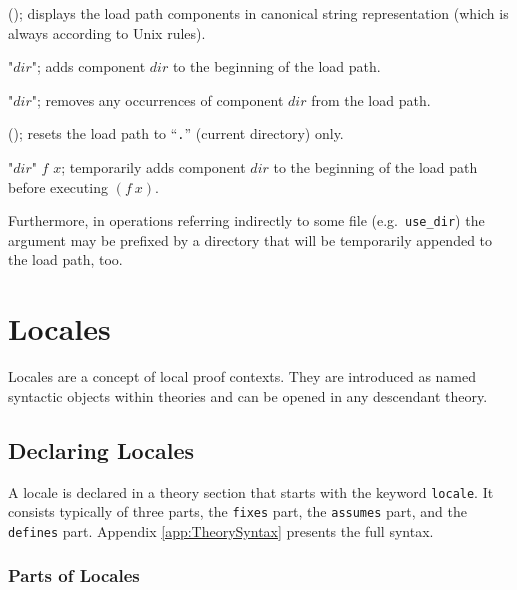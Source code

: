 \begin{ttdescription}
\item[\ttindexbold{show_path}();] displays the load path components in
  canonical string representation (which is always according to Unix rules).
  
\item[\ttindexbold{add_path} "$dir$";] adds component $dir$ to the beginning
  of the load path.
  
\item[\ttindexbold{del_path} "$dir$";] removes any occurrences of component
  $dir$ from the load path.
  
\item[\ttindexbold{reset_path}();] resets the load path to ``\texttt{.}''
  (current directory) only.
  
\item[\ttindexbold{with_path} "$dir$" $f$ $x$;] temporarily adds component
  $dir$ to the beginning of the load path before executing $(f~x)$.

\end{ttdescription}

Furthermore, in operations referring indirectly to some file (e.g.\ 
\texttt{use_dir}) the argument may be prefixed by a directory that will be
temporarily appended to the load path, too.


\section{Locales}
\label{Locales}

Locales \cite{kammueller-locales} are a concept of local proof contexts.  They
are introduced as named syntactic objects within theories and can be
opened in any descendant theory.

\subsection{Declaring Locales}

A locale is declared in a theory section that starts with the
keyword \texttt{locale}.  It consists typically of three parts, the
\texttt{fixes} part, the \texttt{assumes} part, and the \texttt{defines} part.
Appendix \ref{app:TheorySyntax} presents the full syntax.

\subsubsection{Parts of Locales}

